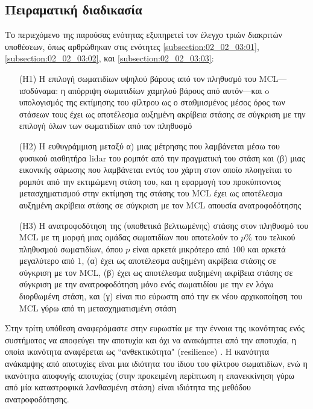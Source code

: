 \subsection{Πειραματική διαδικασία}
\label{subsection:02_02_04:01}

Το περιεχόμενο της παρούσας ενότητας εξυπηρετεί τον έλεγχο τριών διακριτών
υποθέσεων, όπως αρθρώθηκαν στις ενότητες \ref{subsection:02_02_03:01},
\ref{subsection:02_02_03:02}, και \ref{subsection:02_02_03:03}:

\begin{enumerate}
  \item[(H1)] Η επιλογή σωματιδίων υψηλού βάρους από τον πληθυσμό του
        MCL---ισοδύναμα: η απόρριψη σωματιδίων χαμηλού βάρους από αυτόν---και o
        υπολογισμός της εκτίμησης του φίλτρου ως ο σταθμισμένος μέσος όρος
        των στάσεων τους έχει ως αποτέλεσμα αυξημένη ακρίβεια στάσης σε σύγκριση
        με την επιλογή όλων των σωματιδίων από τον πληθυσμό
  \item[(H2)] Η ευθυγράμμιση μεταξύ α) μιας μέτρησης που λαμβάνεται μέσω του
        φυσικού αισθητήρα lidar του ρομπότ από την πραγματική του στάση και
        (β) μιας εικονικής σάρωσης που λαμβάνεται εντός του χάρτη στον οποίο
        πλοηγείται το ρομπότ από την εκτιμώμενη στάση του, και η εφαρμογή του
        προκύπτοντος μετασχηματισμού στην εκτίμηση της στάσης του MCL έχει ως
        αποτέλεσμα αυξημένη ακρίβεια στάσης σε σύγκριση με τον MCL απουσία
        ανατροφοδότησης
  \item[(H3)] Η ανατροφοδότηση της (υποθετικά βελτιωμένης) στάσης στον πληθυσμό
        του MCL με τη μορφή μιας ομάδας σωματιδίων που αποτελούν το $p\%$ του
        τελικού πληθυσμού σωματιδίων, όπου $p$ είναι αρκετά μικρότερο από $100$
        και αρκετά μεγαλύτερο από $1$, (α) έχει ως αποτέλεσμα αυξημένη ακρίβεια
        στάσης σε σύγκριση με τον MCL, (β) έχει ως αποτέλεσμα αυξημένη ακρίβεια
        στάσης σε σύγκριση με την ανατροφοδότηση μόνο ενός σωματιδίου με την εν
        λόγω διορθωμένη στάση, και (γ) είναι πιο εύρωστη από την εκ νέου
        αρχικοποίηση του MCL γύρω από τη μετασχηματισμένη στάση
\end{enumerate}

Στην τρίτη υπόθεση αναφερόμαστε στην ευρωστία με την έννοια της ικανότητας ενός
συστήματος να αποφεύγει την αποτυχία και όχι να ανακάμπτει από την αποτυχία, η
οποία ικανότητα αναφέρεται ως ``ανθεκτικότητα" (resilience)
\cite{Zhu2011b,Tavana2011}. Η ικανότητα ανάκαμψης από αποτυχίες είναι μια
ιδιότητα του ίδιου του φίλτρου σωματιδίων, ενώ η ικανότητα αποφυγής αποτυχίας
(στην προκειμένη περίπτωση η επανεκκίνηση γύρω από μία καταστροφικά λανθασμένη
στάση) είναι ιδιότητα της μεθόδου ανατροφοδότησης.

